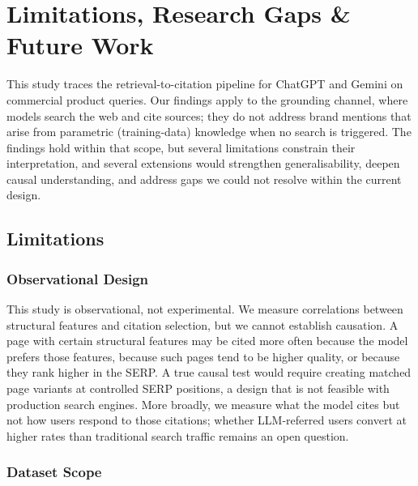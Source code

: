 \chapter{Limitations, Research Gaps \& Future Work}
\label{ch:future-work}

This study traces the retrieval-to-citation pipeline for ChatGPT and Gemini on commercial product queries. Our findings apply to the grounding channel, where models search the web and cite sources; they do not address brand mentions that arise from parametric (training-data) knowledge when no search is triggered. The findings hold within that scope, but several limitations constrain their interpretation, and several extensions would strengthen generalisability, deepen causal understanding, and address gaps we could not resolve within the current design.

\section{Limitations}
\label{sec:limitations}

\subsection{Observational Design}
\label{sec:lim-observational}

This study is observational, not experimental. We measure correlations between structural features and citation selection, but we cannot establish causation. A page with certain structural features may be cited more often because the model prefers those features, because such pages tend to be higher quality, or because they rank higher in the SERP. A true causal test would require creating matched page variants at controlled SERP positions, a design that is not feasible with production search engines. More broadly, we measure what the model cites but not how users respond to those citations; whether LLM-referred users convert at higher rates than traditional search traffic remains an open question.

\subsection{Dataset Scope}
\label{sec:lim-runs}
\label{sec:lim-domain}
\label{sec:lim-language}
\label{sec:lim-fidelity}

